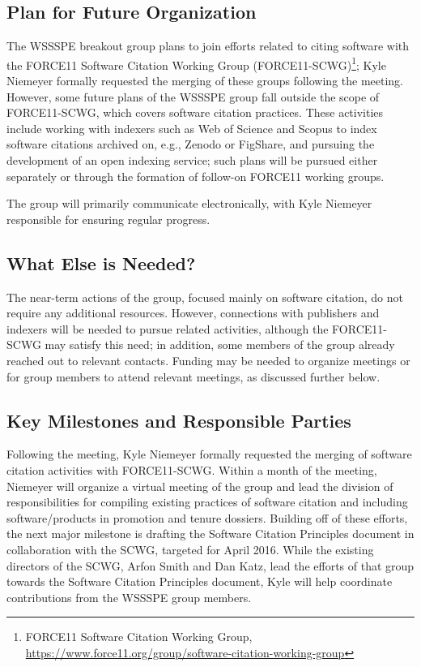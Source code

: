 \subsection{Plan for Future Organization}
\label{SC:plan}

The WSSSPE breakout group plans to join efforts related to citing software with
the FORCE11 Software Citation Working Group (FORCE11-SCWG)\footnote{FORCE11
Software Citation Working Group,
\url{https://www.force11.org/group/software-citation-working-group}}; Kyle
Niemeyer formally requested the merging of these groups following the meeting.
However, some future plans of the WSSSPE group fall outside the scope of
FORCE11-SCWG, which covers software citation practices. These activities include
working with indexers such as Web of Science and Scopus to index software
citations archived on, e.g., Zenodo or FigShare, and pursuing the development of
an open indexing service; such plans will be pursued either separately or
through the formation of follow-on FORCE11 working groups.

The group will primarily communicate electronically, with Kyle Niemeyer
responsible for ensuring regular progress.

\subsection{What Else is Needed?}

The near-term actions of the group, focused mainly on software citation, do not
require any additional resources. However, connections with publishers and
indexers will be needed to pursue related activities, although the FORCE11-SCWG
may satisfy this need; in addition, some members of the group already reached
out to relevant contacts. Funding may be needed to organize meetings or for
group members to attend relevant meetings, as discussed further below.

\subsection{Key Milestones and Responsible Parties}

Following the meeting, Kyle Niemeyer formally requested the merging of software
citation activities with FORCE11-SCWG. Within a month of the meeting, Niemeyer will
organize a virtual meeting of the group and lead the division of
responsibilities for compiling existing practices of software citation and
including software\slash products in promotion and tenure dossiers. Building off
of these efforts, the next major milestone is drafting the Software Citation
Principles document in collaboration with the SCWG, targeted for April 2016.
While the existing directors of the SCWG, Arfon Smith and Dan Katz, lead the
efforts of that group towards the Software Citation Principles document, Kyle
will help coordinate contributions from the WSSSPE group members.


